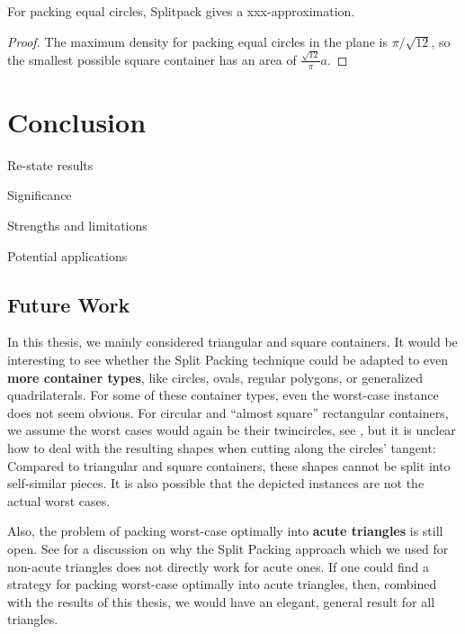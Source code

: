 \documentclass[a4paper,style=print,bibliography=totoc,nexus,lnum,extramargin]{tubsbook}
\begin{document}
\begin{theorem}
    For packing equal circles, Splitpack gives a xxx-approximation.
\end{theorem}

\begin{proof}
    The maximum density for packing equal circles in the plane is $\pi/\sqrt{12}$, so the smallest possible square container has an area of $\frac{\sqrt{12}}{\pi}a$.
\end{proof}

\chapter{Conclusion}

Re-state results

Significance

Strengths and limitations

Potential applications

\section{Future Work}

In this thesis, we mainly considered triangular and square containers. It would be interesting to see whether the Split Packing technique could be adapted to even \textbf{more container types}, like circles, ovals, regular polygons, or generalized quadrilaterals. For some of these container types, even the worst-case instance does not seem obvious. For circular and “almost square” rectangular containers, we assume the worst cases would again be their twincircles, see , but it is unclear how to deal with the resulting shapes when cutting along the circles' tangent: Compared to triangular and square containers, these shapes cannot be split into self-similar pieces. It is also possible that the depicted instances are not the actual worst cases.


Also, the problem of packing worst-case optimally into \textbf{acute triangles} is still open. See  for a discussion on why the Split Packing approach which we used for non-acute triangles does not directly work for acute ones. If one could find a strategy for packing worst-case optimally into acute triangles, then, combined with the results of this thesis, we would have an elegant, general result for all triangles.
\end{document}
